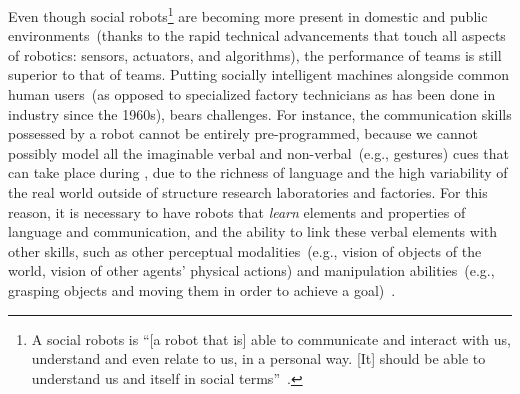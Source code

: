 
Even though social robots\footnote{A social robots is ``[a robot that is] able to communicate and interact with us, understand and even relate to us, in a personal way. [It] should be able to understand us and itself in social terms''~\cite{breazeal:2002:dsr}.} are becoming more present in domestic and public environments~(thanks to the rapid technical advancements that touch all aspects of robotics: sensors, actuators, and algorithms), the performance of \hh{} teams is still superior to that of \hr{} teams.
Putting socially intelligent machines alongside common human users~(as opposed to specialized factory technicians as has been done in industry since the 1960s), bears challenges.
For instance, the communication skills possessed by a robot cannot be entirely pre-programmed, because we cannot possibly model all the imaginable verbal and non-verbal~(e.g., gestures) cues that can take place during \hri, due to the richness of language and the high variability of the real world outside of structure research laboratories and factories.
For this reason, it is necessary to have robots that \emph{learn} elements and properties of language and communication, and the ability to link these verbal elements with other skills, such as other perceptual modalities~(e.g., vision of objects of the world, vision of other agents' physical actions) and manipulation abilities~(e.g., grasping objects and moving them in order to achieve a goal)~\cite{steels:2003:trendscogsci}.

